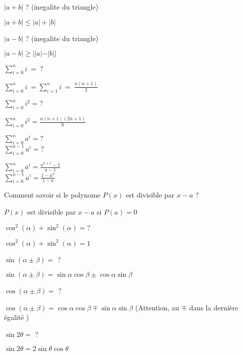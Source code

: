 \documentclass[12pt]{article}
\newcommand*{\xfield}[1]{\begin{mdframed}\centering #1\end{mdframed}\bigskip}
\newenvironment{note}{}{}
\begin{document}
\begin{note}
    \xfield{$|a+b|$ ? (inegalite du triangle)}
    \xfield{$ |a+b| \leqslant |a| + |b|\ $}
\end{note}

\begin{note}
    \xfield{$|a-b|$ ? (inegalite du triangle)}
    \xfield{$|a - b| \geqslant ||a|-|b||$}
\end{note}

\begin{note}
    \xfield{$\sum_{i=0}^n i\ =\ ? $}
    \xfield{$\sum_{i=0}^n i\ = \sum_{i=1}^n i\ =\ \frac{n(n+1)}{2}$}
\end{note}

\begin{note}
    \xfield{$\sum_{i=0}^n i^2 = ?$}
    \xfield{$\sum_{i=0}^n i^2 = \frac{n(n+1)(2n+1)}{6}$}
\end{note}

\begin{note}
    \xfield{
        $\sum_{i=0}^n a^i = ? $\\        
        $\sum_{i=0}^{n-1} a^i = ? $
    }
    \xfield{$\sum_{i=0}^n a^i = \frac{a^{n+1}-1}{a-1}$\\$\sum_{i=0}^{n-1} a^i = \frac{1-a^{n}}{1-a}$}
\end{note}

\begin{note}
    \xfield{Comment savoir si le polynome $P(x)$ est divisible par $x - a$ ? }
    \xfield{$P(x)$ est divisible par $x-a$ si $P(a) = 0$}
\end{note}

\begin{note}
    \xfield{$\cos^2(\alpha) + \sin^2(\alpha) = ?$}
    \xfield{$\cos^2(\alpha) + \sin^2(\alpha) = 1$}
\end{note}

\begin{note}
    \xfield{$\sin(\alpha \pm \beta) =$ ?}
    \xfield{$\sin(\alpha \pm \beta) = \sin \alpha \cos \beta \pm \cos \alpha \sin \beta$}
\end{note}

\begin{note}
    \xfield{$\cos(\alpha \pm \beta) =$ ?}
    \xfield{$\cos(\alpha \pm \beta) = \cos \alpha \cos \beta \mp \sin \alpha \sin \beta$ (Attention, au $\mp$ dans la dernière égalité )}
\end{note}

\begin{note}
    \xfield{$\sin 2\theta =$ ?}
    \xfield{$\sin 2\theta = 2 \sin \theta \cos \theta $}
\end{note}
\end{document}
